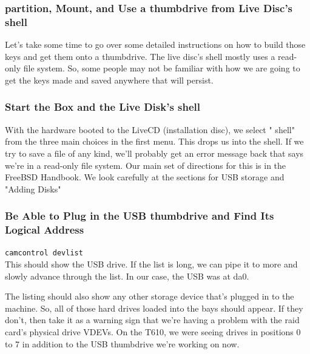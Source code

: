 \subsubsection{\gls{partition}, Mount, and Use a  \Gls{thumbdrive} from Live Disc's  \Gls{shell}}
Let's take some time to go over some detailed instructions on how to build those keys and get them onto a  \gls{thumbdrive}.  The live disc's  \gls{shell} mostly uses a read-only file system.  So, some people may not be familiar with how we are going to get the keys made and saved anywhere that will persist.
\subsubsection{Start the Box and the Live Disk's  \Gls{shell}}
With the hardware booted to the LiveCD (installation disc), we select " \Gls{shell}" from the three main choices in the first menu.  This drops us into the  \gls{shell}.  If we try to save a file of any kind, we'll probably get an error message back that says we're in a read-only file system.
Our main set of directions for this is in the FreeBSD Handbook.  We look carefully at the sections for USB storage and "Adding Disks"
\subsubsection{Be Able to Plug in the USB  \Gls{thumbdrive} and Find Its Logical Address}

\texttt{camcontrol devlist}\\

This should show the USB drive.  If the list is long, we can  \gls{pipe} it to more and slowly advance through the list.  In our case, the USB was at da0.

The listing should also show any other storage device that's plugged in to the machine.  So, all of those hard drives loaded into the bays should appear.  If they don't, then take it as a warning sign that we're having a problem with the  \gls{raid} card's physical drive VDEVs.  On the T610, we were seeing drives in positions 0 to 7 in addition to the USB  \gls{thumbdrive} we're working on now.

